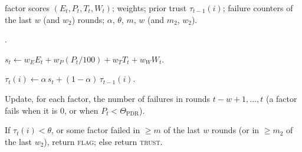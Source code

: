 \documentclass[lineno,pdflatex,sn-nature]{sn-jnl}
\theoremstyle{thmstyleone}%
\theoremstyle{thmstylethree}%
\begin{document}
\begin{algorithm}[!t]
\caption{Extension~I trust update for node $i$ at round $t$.}
\label{alg:ema}
 factor scores $(E_t,P_t,T_t,W_t)$; weights;
prior trust $\tau_{t-1}(i)$; failure counters of the last $w$ (and
$w_2$) rounds; $\alpha$, $\theta$, $m$, $w$ (and $m_2$, $w_2$).

\begin{list}{.}{\setlength{\topsep}{1pt}\setlength{\partopsep}{0pt}\setlength{\itemsep}{0pt}\setlength{\parsep}{0pt}\setlength{\leftmargin}{1.6em}\setlength{\labelwidth}{1.2em}\setlength{\labelsep}{0.4em}}
  \item $s_t \gets w_E E_t + w_P (P_t/100) + w_T T_t + w_W W_t$.
  \item $\tau_t(i) \gets \alpha\,s_t + (1-\alpha)\,\tau_{t-1}(i)$.
  \item Update, for each factor, the number of failures in rounds
        $t-w+1,\dots,t$ (a factor fails when it is $0$, or when
        $P_t<\Theta_{\mathrm{PDR}}$).
  \item If $\tau_t(i)<\theta$, or some factor failed in $\ge m$ of the
        last $w$ rounds (or in $\ge m_2$ of the last $w_2$), return
        \textsc{flag}; else return \textsc{trust}.
\end{list}\vspace{-2pt}
\end{algorithm}
\end{document}
